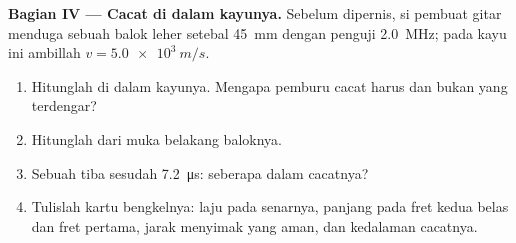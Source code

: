 \begin{problem}
\medskip
\noindent\textbf{Bagian IV --- Cacat di dalam kayunya.}
Sebelum dipernis, si pembuat gitar menduga sebuah balok leher setebal
\qty{45}{mm} dengan penguji \qty{2.0}{MHz}; pada kayu ini ambillah
$v = \qty{5.0e3}{m/s}$.
\begin{enumerate}[resume]
  \item Hitunglah   di dalam kayunya.
        Mengapa  pemburu cacat harus  dan bukan
         yang terdengar?
  \item Hitunglah   dari muka belakang baloknya.
  \item Sebuah  tiba sesudah \qty{7.2}{\micro s}: seberapa dalam
        cacatnya?
  \item Tulislah kartu bengkelnya: laju  pada senarnya,
        panjang pada fret kedua belas dan fret pertama, jarak menyimak
        yang aman, dan kedalaman cacatnya.
\end{enumerate}
\end{problem}
